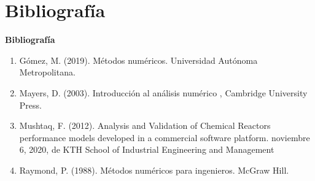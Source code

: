 \documentclass{beamer}
\begin{document}
\section{Bibliografía }

\begin{frame}
	\textbf{Bibliografía}
	\begin{enumerate}
		\item
			Gómez, M. (2019). Métodos numéricos. Universidad Autónoma Metropolitana.
		\item
			Mayers, D. (2003). Introducción al análisis numérico , Cambridge University Press.
		\item
			Mushtaq, F. (2012). Analysis and Validation of Chemical Reactors performance models developed in a commercial software platform. noviembre 6, 2020, de KTH School of Industrial Engineering and Management
		\item
			Raymond, P. (1988). Métodos numéricos para ingenieros. McGraw Hill.
	\end{enumerate} 
\end{frame}
\end{document}
